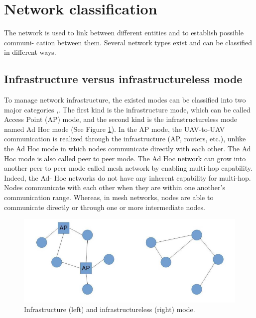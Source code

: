 \documentclass[11pt,openany]{book}
\begin{document}
\section{Network classification}
The network is used to link between diﬀerent entities and to establish possible communi- cation between them. Several network types exist and can be classiﬁed in diﬀerent ways.
\subsection{Infrastructure versus infrastructureless mode}
To manage network infrastructure, the existed modes can be classiﬁed into two major categories \cite{bekmezci2013flying},\cite{hayat2015experimental}. The ﬁrst kind is the infrastructure mode, which can be called Access Point (AP) mode, and the second kind is
the infrastructureless mode named Ad Hoc mode (See Figure \ref{fig:4.1}). In the AP mode, the UAV-to-UAV communication is realized through the infrastructure (AP, routers, etc.), unlike the Ad Hoc mode in which nodes communicate directly with each other. The Ad Hoc mode is also called peer to peer mode. The Ad Hoc network can grow into another peer to peer mode called mesh network by enabling multi-hop capability. Indeed, the Ad- Hoc networks do not have any inherent capability for multi-hop. Nodes communicate with each other when they are within one another’s communication range. Whereas, in mesh networks, nodes are able to communicate directly or through one or more intermediate nodes.
\begin{figure}[H]
    \centering
    \includegraphics[scale=0.4]{assets/4_1.png}
    \caption{Infrastructure (left) and infrastructureless (right) mode.}
    \label{fig:4.1}
\end{figure}
\end{document}

